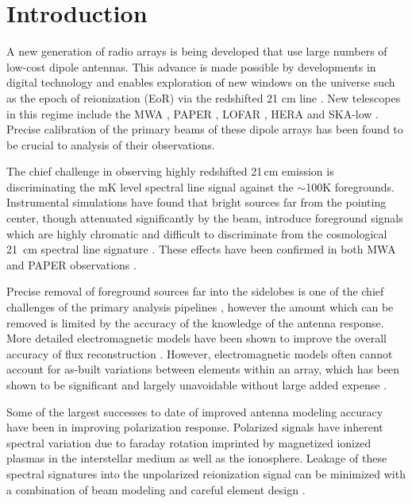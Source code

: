 \documentclass[preprint2,numberedappendix,tighten,twocolappendix]{aastex6}
\begin{document}
\section{Introduction}\label{sec:intro}

A new generation of radio arrays is being developed that use large numbers of low-cost dipole antennas. This advance is made possible by developments in digital technology and enables exploration of new windows on the universe such as the epoch of reionization (EoR) via the redshifted 21 cm line \citep{Morales:2010p8093,Furlanetto:2006p2267,Madau:1997p2232}.  New telescopes in this regime include the MWA \citep{Tingay:2013p9022,Bowman:2013p9950}, PAPER \citep{Pober:2012p8800,2015ApJ...809...61A,2013ApJ...776..108J}, LOFAR \cite{Yatawatta:2013p9699}, HERA \citep{2016:deBoerHERAarxiv} and SKA-low \citep{Mellema:2013p10035,Mort:2016SKAlowimagingarxiv}.   Precise calibration of the primary beams of these dipole arrays has been found to be crucial to analysis of their observations.

The chief challenge in observing highly redshifted 21\,cm emission is discriminating the mK level spectral line signal against the $\sim$100K foregrounds.  Instrumental simulations have found that bright sources far from the pointing center, though attenuated significantly by the beam, introduce foreground signals which are highly chromatic and difficult to discriminate from the cosmological 21~cm spectral line signature \citep{Thyagarajan:2013p10039,2015ApJ...804...14T,Mort:2016SKAlowimagingarxiv}. These effects have been confirmed in both MWA and PAPER observations \citep{2015:ThyagarajanConfirmationwidefield,Pober:2016ApJ...819....8P}. 

Precise removal of foreground sources far into the sidelobes is one of the chief challenges of the primary analysis pipelines  \citep{2016:JacobsPipelinepaper}, however the amount which can be removed is limited by the accuracy of the knowledge of the antenna response.  More detailed electromagnetic models have been shown to improve the overall accuracy of flux reconstruction \citep{Sutinjo:2015RaSc...50...52S}.   However, electromagnetic models often cannot account for as-built variations between elements within an array, which has been shown to be significant and largely unavoidable without large added expense \citep{2016:NebenBeamformingerrors}.  

Some of the largest successes to date of improved antenna modeling accuracy have been in improving polarization response. Polarized signals have inherent spectral variation due to faraday rotation imprinted by magnetized ionized plasmas in the interstellar medium as well as the ionosphere. Leakage of these spectral signatures into the unpolarized reionization signal can be minimized with a combination of beam modeling and careful element design \citep{Jelic:2010p8293,Moore:2013p9941,Asad:2015LofarPol}.
\end{document}

